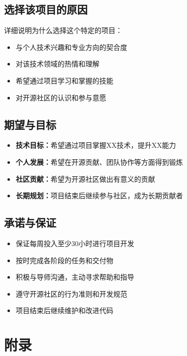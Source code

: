 \documentclass[a4paper,12pt]{article}
\begin{document}
\subsection{选择该项目的原因}
详细说明为什么选择这个特定的项目：
\begin{itemize}
    \item 与个人技术兴趣和专业方向的契合度
    \item 对该技术领域的热情和理解
    \item 希望通过项目学习和掌握的技能
    \item 对开源社区的认识和参与意愿
\end{itemize}

\subsection{期望与目标}
\begin{itemize}
    \item \textbf{技术目标：}希望通过项目掌握XX技术，提升XX能力
    \item \textbf{个人发展：}希望在开源贡献、团队协作等方面得到锻炼
    \item \textbf{社区贡献：}希望为开源社区做出有意义的贡献
    \item \textbf{长期规划：}项目结束后继续参与社区，成为长期贡献者
\end{itemize}

\subsection{承诺与保证}
\begin{itemize}
    \item 保证每周投入至少30小时进行项目开发
    \item 按时完成各阶段的任务和交付物
    \item 积极与导师沟通，主动寻求帮助和指导
    \item 遵守开源社区的行为准则和开发规范
    \item 项目结束后继续维护和改进代码
\end{itemize}

\section{附录}
\end{document}
